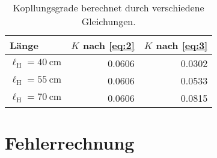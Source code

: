 \documentclass[
12pt,
a4paper,
bibliography=totocnumbered, %
BCOR=1cm, %
oneside, %
]{scrartcl}
\newcommand{\lh}{\ell_{\mathrm{H}}}
\begin{document}
\begin{table}[H]
	\begin{tabular*}{\textwidth}{@{\extracolsep{\fill}}@{\hspace{5pt}}lrr@{\hspace{5pt}}}
		\toprule
		Länge & \(K\) nach \autoref{eq:2} & \(K\) nach \autoref{eq:3}\\
		\midrule
		\(\lh = \qty{40}{\centi\meter}\) & \num{0,0606} & \num{0,0302}\\
		\(\lh = \qty{55}{\centi\meter}\) & \num{0,0606} & \num{0,0533}\\
		\(\lh = \qty{70}{\centi\meter}\) & \num{0,0606} & \num{0,0815}\\
		\bottomrule
	\end{tabular*}
	\caption{Kopllungsgrade berechnet durch verschiedene Gleichungen. \label{tbl:kopplungsgrade}}
\end{table}

\section{Fehlerrechnung}
\end{document}
